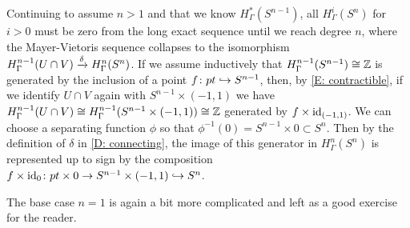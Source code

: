 \begin{example}
Continuing to assume $n>1$ and that we know $H^*_\Gamma(S^{n-1})$, all $H^i_\Gamma(S^n)$ for $i>0$ must be zero from the long exact sequence until we reach degree $n$, where the Mayer-Vietoris sequence collapses to the isomorphism $H^{n-1}_\Gamma(U \cap V) \xrightarrow{\delta} H^n_\Gamma(S^n)$.
If we assume inductively that $H^{n-1}_\Gamma(S^{n-1}) \cong \mathbb{Z}$ is generated by the inclusion of a point $f \colon pt \hookrightarrow S^{n-1}$, then, by \cref{E: contractible}, if we identify $U \cap V$ again with $S^{n-1} \times (-1,1)$ we have $H^{n-1}_\Gamma(U \cap V) \cong H^{n-1}_\Gamma(S^{n-1} \times (-1,1))\cong \mathbb{Z}$ generated by $f \times \mathrm{id}_{(-1,1)}$.
We can choose a separating function $\phi$ so that $\phi^{-1}(0) = S^{n-1} \times 0 \subset S^n$.
Then by the definition of $\delta$ in \cref{D: connecting}, the image of this generator in $H^n_\Gamma(S^n)$ is represented up to sign by the composition $f \times \mathrm{id}_{0} \colon pt \times 0 \to S^{n-1} \times (-1,1) \hookrightarrow S^n$.

The base case $n=1$ is again a bit more complicated and left as a good exercise for the reader.
\end{example}



